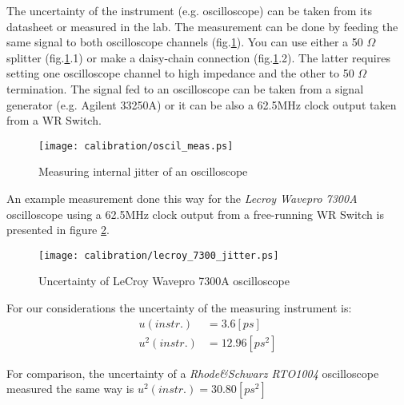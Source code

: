 The uncertainty of the instrument (e.g. oscilloscope) can be taken from
its datasheet or measured in the lab. The measurement can be done by feeding
the same signal to both oscilloscope channels (fig.\ref{fig:errors:osc_jitter}).
You can use either a 50 $\Omega$ splitter (fig.\ref{fig:errors:osc_jitter}.1) or
make a daisy-chain connection (fig.\ref{fig:errors:osc_jitter}.2). The
latter requires setting one oscilloscope channel to high impedance and the
other to 50 $\Omega$ termination. The signal fed to an oscilloscope can be taken
from a signal generator (e.g. Agilent 33250A) or it can be also a 62.5MHz clock
output taken from a WR Switch.
\begin{figure}[ht]
	\begin{center}
	\texttt{[image: calibration/oscil\_meas.ps]}
	\caption{Measuring internal jitter of an oscilloscope}
	\label{fig:errors:osc_jitter}
	\end{center}
\end{figure}
An example measurement done this way for the \emph{Lecroy Wavepro 7300A}
oscilloscope using a 62.5MHz clock output from a free-running WR Switch is
presented in figure \ref{fig:errors:lecroy_jitter}.
\begin{figure}
	\begin{center}
	\texttt{[image: calibration/lecroy\_7300\_jitter.ps]}
	\caption{Uncertainty of LeCroy Wavepro 7300A oscilloscope}
	\label{fig:errors:lecroy_jitter}
	\end{center}
\end{figure}
For our considerations the uncertainty of the measuring instrument is:
\begin{align}
	u(instr.) &= 3.6 [ps]\\
	\label{equ:errors:ulecroy}
  u^2(instr.) &= 12.96 [ps^2]
\end{align}

\noindent For comparison, the uncertainty of a \emph{Rhode\&Schwarz RTO1004}
oscilloscope measured the same way is $u^2(instr.) = 30.80 [ps^2]$\\

